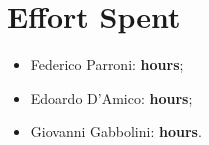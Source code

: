 \chapter{Effort Spent}
\begin{itemize}
\item Federico Parroni: \textbf{ hours};
\item Edoardo D'Amico: \textbf{ hours};
\item Giovanni Gabbolini: \textbf{ hours}.
\end{itemize}

